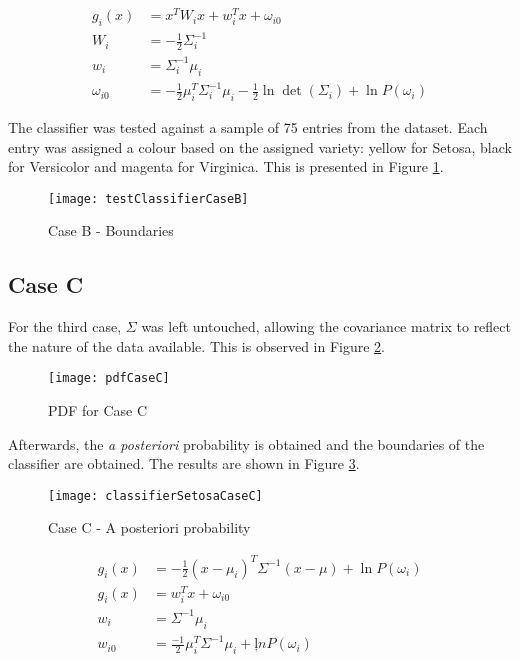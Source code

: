 \begin{align*}
 g_i(x) &= x^T W_i x + w^T_i x + \omega_{i0}\\
 W_i &= -\frac{1}{2}\Sigma^{-1}_i\\
 w_i &= \Sigma^{-1}_i \mu_i\\
 \omega_{i0}&= -\frac{1}{2} \mu^T_i \Sigma^{-1}_i \mu_i - \frac{1}{2}\ln \det(\Sigma_i) + \ln P(\omega_i)
\end{align*}

\pagebreak
\newpage


The classifier was tested against a sample of 75 entries from the dataset. Each entry was assigned a colour based on the assigned variety:
yellow for Setosa, black for Versicolor and magenta for Virginica.
This is presented in Figure \ref{fig: classifier case B}.

\begin{figure}[htb!]
\centering
 \texttt{[image: testClassifierCaseB]}
 \caption{Case B - Boundaries}
 \label{fig: classifier case B}
\end{figure}

\pagebreak
\newpage


\pagebreak
\newpage

\subsection{Case C}
For the third case, $\Sigma$ was left untouched, allowing the covariance matrix to
reflect the nature of the data available.
This is observed in Figure \ref{fig: case c PDF}.

\begin{figure}[htb!]
 \texttt{[image: pdfCaseC]}
 \caption{PDF for Case C}
 \label{fig: case c PDF}
\end{figure}

\pagebreak
\newpage


Afterwards, the \emph{a posteriori} probability is obtained and the boundaries of the classifier are obtained.
The results are shown in Figure \ref{fig: posteriori case C}.

\begin{figure}[htb!]
\centering
 \texttt{[image: classifierSetosaCaseC]}
 \caption{Case C - A posteriori probability}
 \label{fig: posteriori case C}
\end{figure}

\pagebreak
\newpage

\begin{align*}
 g_i(x) &= -\frac{1}{2} (x-\mu_i)^T \Sigma^{-1} (x-\mu) + \ln P(\omega_i)\\
 g_i(x) &= w^T_i x + \omega_{i0}\\
 w_i &= \Sigma^{-1} \mu_i\\
 w_{i0} &= \frac{-1}{2}\mu^T_i \Sigma^{-1}  \mu_i + ļn P(\omega_i)
\end{align*}

